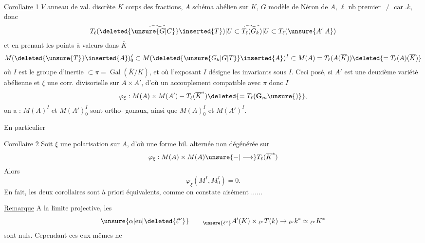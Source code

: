 \uline{Corollaire} 1 $V$ anneau de val. discrète  $K$ corps des fractions,  $A$ schéma abélien sur $K$, $G$ modèle de Néron de $A$,   $\ell$ nb premier $\ne\operatorname{car}.k$,  donc
\[
\widetilde{T_\ell(\deleted{\unsure{G|C}}\inserted{T})}|U\subset\widetilde{T_\ell(G_k)}|U\subset T_\ell(\unsure{A'|A})
\]
et en prenant les points à valeurs dans $\overline K$
\[
M(\deleted{\unsure{T}}\inserted{A})_0^I\subset M(\deleted{\unsure{G_k|G|T}}\inserted{A})^I\subset M(A)=T_\ell(A(\overline K))\deleted{=T_\ell(A)(\overline K)}
\]
où $I$ est le groupe d'inertie $\subset\pi=\operatorname{Gal}(\overline K/K)$, et où l'exposant $I$ désigne les invariants sous $I$.
Ceci posé, si $A'$ est une deuxième variété abélienne  et $\xi$ une  corr. divisorielle sur $A\times A'$, d'où un accouplement compatible avec $\pi$ donc $I$
\[
\varphi_\xi:M(A)\times M(A')\mathbin{-}T_\ell(\overline K^*)\deleted{=T_\ell(\mathbf G_m\unsure{)}},
\]
on a :  $M(A)^I$ et $M(A')_0^I$ sont ortho-
gonaux, ainsi que $M(A)_0^I$ et $M(A')^I$.

En particulier

\uline{Corollaire 2} Soit $\xi$ une \uline{polarisation} sur $A$, d'où
une forme bil. alternée non dégénérée sur
\[
\varphi_\xi:M(A)\times M(A)\unsure{\mathbin{-}|\longrightarrow}T_\ell(\overline K^*)
\]
Alors
\[
\varphi_\xi(M^I,M_0^I)=0.
\]
En fait, les deux corollaires sont à priori équivalents, comme on constate aisément $\ldots\ldots$

\uline{Remarque} A la limite projective,  les 
\[
\unsure{\alpha|\text{en}|\deleted{\ell^\nu}}\qquad {}_{\unsure{\ell^\nu}}A'(K)\times{}_{\ell^\nu}T(k)\to{}_{\ell^\nu}k^*\simeq{}_{\ell^\nu}K^*
\]
sont nuls. Cependant ces  eux mêmes ne

